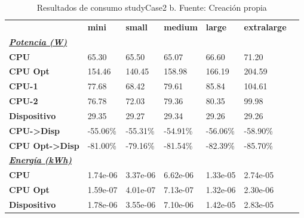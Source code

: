 \begin{table}[H]
    \centering
    \begin{tabular}{lllllll}
    \rowcolor[HTML]{DAE8FC} \ & \textbf{mini} & \textbf{small} & \textbf{medium} & \textbf{	large} & \textbf{	extralarge} \\
    \cellcolor[HTML]{DAE8FC} \textbf{\textbf{{\emph{{\underline{{Potencia (W)}}}}}}} &  &  &  & 	 & 	 \\
    \rowcolor[HTML]{EFEFEF} \cellcolor[HTML]{DAE8FC} \textbf{CPU} & 65.30 & 65.50 & 65.07 & 	66.60 & 	71.20 \\
    \cellcolor[HTML]{DAE8FC} \textbf{CPU Opt} & 154.46 & 140.45 & 158.98 & 	166.19 & 	204.59 \\
    \rowcolor[HTML]{EFEFEF} \cellcolor[HTML]{DAE8FC} \textbf{\quad CPU-1} & 77.68 & 68.42 & 79.61 & 	85.84 & 	104.61 \\
    \cellcolor[HTML]{DAE8FC} \textbf{\quad CPU-2} & 76.78 & 72.03 & 79.36 & 	80.35 & 	99.98 \\
    \rowcolor[HTML]{EFEFEF} \cellcolor[HTML]{DAE8FC} \textbf{Dispositivo} & 29.35 & 29.27 & 29.34 & 	29.26 & 	29.26 \\
    \cellcolor[HTML]{DAE8FC} \textbf{CPU->Disp} & -55.06\% & -55.31\% & -54.91\% & 	-56.06\% & 	-58.90\% \\
    \rowcolor[HTML]{EFEFEF} \cellcolor[HTML]{DAE8FC} \textbf{CPU Opt->Disp} & -81.00\% & -79.16\% & -81.54\% & 	-82.39\% & 	-85.70\% \\
    \cellcolor[HTML]{DAE8FC} \textbf{\textbf{{\emph{{\underline{{Energía (kWh)}}}}}}} &  &  &  & 	 & 	 \\
    \rowcolor[HTML]{EFEFEF} \cellcolor[HTML]{DAE8FC} \textbf{CPU} & 1.74e-06 & 3.37e-06 & 6.62e-06 & 	1.33e-05 & 	2.74e-05 \\
    \cellcolor[HTML]{DAE8FC} \textbf{CPU Opt} & 1.59e-07 & 4.01e-07 & 7.13e-07 & 	1.32e-06 & 	2.30e-06 \\
    \rowcolor[HTML]{EFEFEF} \cellcolor[HTML]{DAE8FC} \textbf{Dispositivo} & 1.78e-06 & 3.55e-06 & 7.10e-06 & 	1.42e-05 & 	2.83e-05 \\
    \end{tabular}
    \caption[Resultados de consumo studyCase2 b]{{Resultados de consumo studyCase2 b. Fuente: Creación propia}}
    \label{table_test_studyCase2_b_hw_powerResults}
\end{table}